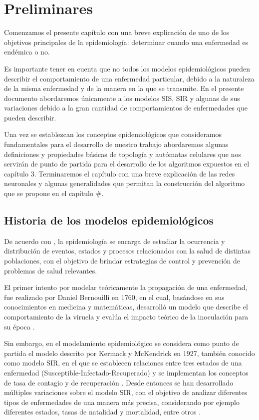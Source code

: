 \chapter{Preliminares}\label{ch:Preliminares}
Comenzamos el presente capítulo con una breve explicación de uno de los objetivos principales de la epidemiología: determinar cuando una enfermedad es endémica o no.

Es importante tener en cuenta que no todos los modelos epidemiológicos pueden describir el comportamiento de una enfermedad particular, debido a la naturaleza de la misma enfermedad y de la manera en la que se transmite. En el presente documento abordaremos únicamente a los modelos SIS, SIR y algunas de sus variaciones debido a la gran cantidad de comportamientos de enfermedades que pueden describir.

Una vez se establezcan los conceptos epidemiológicos que consideramos fundamentales para el desarrollo de nuestro trabajo abordaremos algunas definiciones y propiedades básicas de topología y autómatas celulares que nos servirán de punto de partida para el desarrollo de los algoritmos expuestos en el capítulo 3. Terminaremos el capítulo con una breve explicación de las redes neuronales y algunas generalidades que permitan la construcción del algoritmo que se propone en el capítulo $\#$.

\section{Historia de los modelos epidemiológicos}\label{sec:Historia de la epidemiología}
De acuerdo con \cite{epiDictionary}, la epidemiología se encarga de estudiar la ocurrencia y distribución de eventos, estados y procesos relacionados con la salud de distintas poblaciones, con el objetivo de brindar estrategias de control y prevención de problemas de salud relevantes.

El primer intento por modelar teóricamente la propagación de una enfermedad, fue realizado por Daniel Bernouilli en 1760, en el cual, basándose en sus conocimientos en medicina y matemáticas, desarrolló un modelo que describe el comportamiento de la viruela y evalúa el impacto teórico de la inoculación para su época \cite{shortHistory}. 

Sin embargo, en el modelamiento epidemiológico se considera como punto de partida el modelo descrito por Kermack y McKendrick en 1927, también conocido como modelo SIR, en el que se establecen relaciones entre tres estados de una enfermedad (Susceptible-Infectado-Recuperado) y se implementan los conceptos de tasa de contagio y de recuperación \cite{malariaSIR}. Desde entonces se han desarrollado múltiples variaciones sobre el modelo SIR, con el objetivo de analizar diferentes tipos de enfermedades de una manera más precisa, considerando por ejemplo diferentes estados, tasas de natalidad y mortalidad, entre otros \cite{diego2010}.

